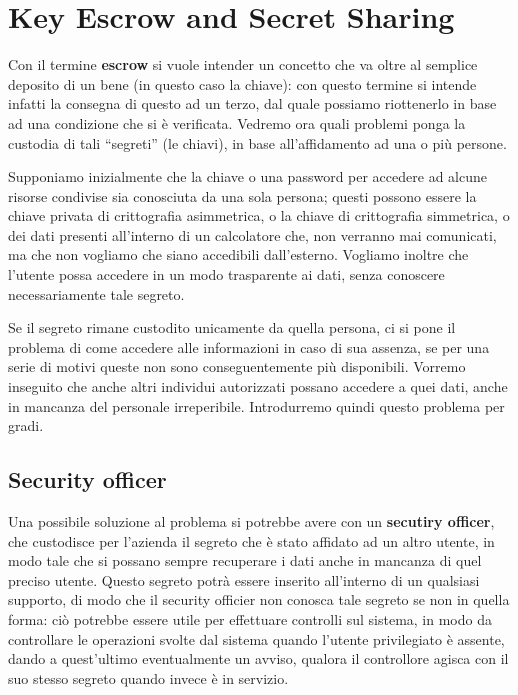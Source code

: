 \section{Key Escrow and Secret Sharing}

Con il termine \textbf{escrow} si vuole intender un concetto che va oltre al 
semplice deposito di un bene (in questo caso la chiave): con questo termine 
si intende infatti la consegna di questo ad un terzo, dal quale possiamo 
riottenerlo in base ad una condizione che si è verificata. Vedremo ora quali 
problemi ponga la custodia di tali ``segreti'' (le chiavi), in base all'affidamento
ad una o più persone. 


Supponiamo inizialmente che la chiave o una password per accedere ad alcune
risorse condivise sia conosciuta da una 
sola persona; questi possono essere la chiave privata di crittografia 
asimmetrica, o la chiave di crittografia simmetrica, o dei dati presenti
all'interno di un calcolatore che, non verranno mai comunicati, ma che 
non vogliamo che siano accedibili dall'esterno. Vogliamo inoltre che l'utente possa accedere
in un modo trasparente ai dati, senza conoscere necessariamente tale segreto.


Se il segreto rimane custodito unicamente da quella persona, ci si pone il problema di come 
accedere alle informazioni in caso di sua assenza, 
se per una serie di motivi queste non sono conseguentemente più disponibili. 
Vorremo inseguito che anche altri individui autorizzati possano accedere a quei dati,
anche in mancanza del personale irreperibile. Introdurremo quindi questo problema per gradi.


\subsection{Security officer}
Una possibile soluzione al problema si potrebbe avere con un \textbf{secutiry 
officer}, che custodisce per l'azienda il segreto che è stato affidato
ad un altro utente, in modo tale che si possano sempre recuperare i dati anche 
in mancanza di quel preciso utente. Questo segreto potrà essere inserito 
all'interno di un qualsiasi supporto, di modo che il security officier non conosca tale segreto
se non in quella forma: ciò potrebbe essere utile per effettuare 
controlli sul sistema, in modo da controllare le operazioni svolte dal sistema
quando l'utente privilegiato è assente, dando a quest'ultimo 
eventualmente un avviso, qualora il controllore agisca con il suo stesso segreto
quando invece è in servizio. 


